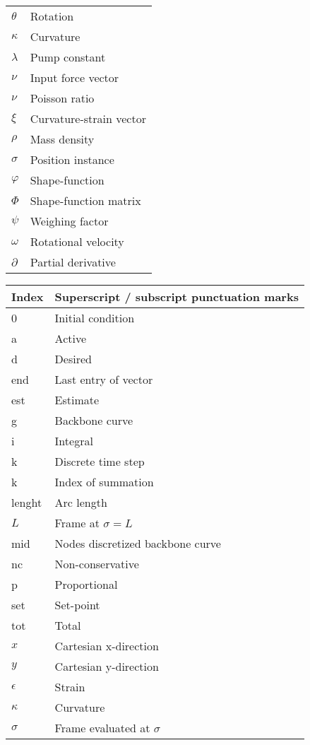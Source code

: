 \begin{spacing}{0.9}
\begin{multicols}{2}
\begin{table}[H]
\begin{tabular}{p{2.8cm} p{3.2cm}}
    $\theta$      & Rotation \\
    $\kappa$     &  Curvature \\
    $\lambda$    &  Pump constant \\
    $\nu$     &  Input force vector \\
    $\nu$     &  Poisson ratio \\
    $\xi$     &  Curvature-strain vector \\
    $\rho$     &  Mass density \\
    $\sigma$     &  Position instance \\
    $\varphi$     &  Shape-function \\
    $\Phi$    &  Shape-function matrix \\
    $\psi$        & Weighing factor \\
    $\omega$     &  Rotational velocity \\
    $\partial$     &  Partial derivative \\ \hline
    
    \end{tabular}
\end{table}


\begin{table}[H]
\centering
    \begin{tabular}{p{1.5cm} p{5cm}} \hline
    \textbf{Index}    &   \textbf{Superscript / subscript punctuation marks}\\ \hline
    0     &  Initial condition \\
    a     &  Active \\
    d     &  Desired \\
    end   & Last entry of vector \\
    est   & Estimate \\
    g     & Backbone curve \\
    i     & Integral \\
    k     & Discrete time step \\
    k     & Index of summation \\
    lenght & Arc length \\
    $L$   & Frame at $\sigma = L$ \\
    mid    & Nodes discretized backbone curve \\
    nc    & Non-conservative \\
    p    & Proportional \\
    set   & Set-point \\
    tot    & Total \\
    $x$    & Cartesian x-direction \\
    $y$    & Cartesian y-direction \\
    $\epsilon$  & Strain \\
    $\kappa$ & Curvature \\ 
    $\sigma$   & Frame evaluated at $\sigma$ \\\hline
    \end{tabular}
\end{table}







\end{multicols}
\end{spacing}
